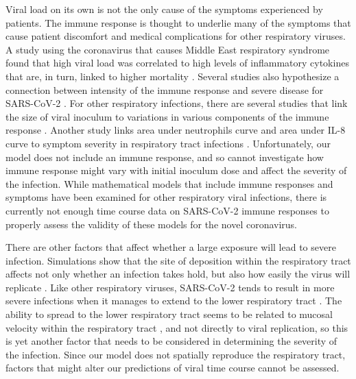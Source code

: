 Viral load on its own is not the only cause of the symptoms experienced by patients. The immune response is thought to underlie many of the symptoms that cause patient discomfort \citep{hijano19} and medical complications \citep{xu19} for other respiratory viruses. A study using the coronavirus that causes Middle East respiratory syndrome found that high viral load was correlated to high levels of inflammatory cytokines that are, in turn, linked to higher mortality \citep{alosaimi20}. Several studies also hypothesize a connection between intensity of the immune response and severe disease for SARS-CoV-2 \citep{lin20,cao20path,zhu20cardio}. For other respiratory infections, there are several studies that link the size of viral inoculum to variations in various components of the immune response \citep{go19, littwitz17, handel18, redeker14, anderson10}. Another study links area under neutrophils curve and area under IL-8 curve to symptom severity in respiratory tract infections \citep{henriquez15}. Unfortunately, our model does not include an immune response, and so cannot investigate how immune response might vary with initial inoculum dose and affect the severity of the infection. While mathematical models that include immune responses \citep{dobrovolny13} and symptoms \citep{canini11,price15} have been examined for other respiratory viral infections, there is currently not enough time course data on SARS-CoV-2 immune responses to properly assess the validity of these models for the novel coronavirus.  

There are other factors that affect whether a large exposure will lead to severe infection. Simulations show that the site of deposition within the respiratory tract affects not only whether an infection takes hold, but also how easily the virus will replicate \citep{haghnegahdar19}. Like other respiratory viruses, SARS-CoV-2 tends to result in more severe infections when it manages to extend to the lower respiratory tract \citep{COVID20}. The ability to spread to the lower respiratory tract seems to be related to mucosal velocity within the respiratory tract \citep{gonzalez19,quirouette20}, and not directly to viral replication, so this is yet another factor that needs to be considered in determining the severity of the infection. Since our model does not spatially reproduce the respiratory tract, factors that might alter our predictions of viral time course cannot be assessed.

